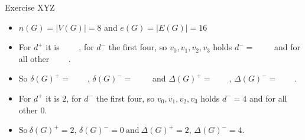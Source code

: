 \begin{frame}{Exercise \thesection}{XYZ\vspace{0.5cm}}
\begin{solution}
\begin{itemize}
      \item $n(G)=|V(G)|=8$ and $e(G)=|E(G)|=16$
    \end{itemize}
  \end{solution}
  \begin{solutionnoinc}
    \begin{itemize}
      \item For $d^+$ it is $\qquad$, for $d^-$ the first four, so $v_0, v_1, v_2, v_3$ holds $d^- = \qquad$ and for all other $\qquad$.
      \item So $\delta(G)^{+}=\qquad, \,\delta(G)^{-}=\qquad$ and $\Delta(G)^{+}=\qquad,\,\Delta(G)^{-}=\qquad.$
    \end{itemize}
  \end{solutionnoinc}
  \newpage
  \begin{solution}
    \begin{itemize}
      \item For $d^+$ it is $2$, for $d^-$ the first four, so $v_0, v_1, v_2, v_3$ holds $d^- = 4$ and for all other $0$.
      \item $\mathrm{So~}\delta(G)^{+}=2, \,\delta(G)^{-}=0\mathrm{~and~}\Delta(G)^{+}=2,\,\Delta(G)^{-}=4.$
    \end{itemize}
  \end{solution}
\end{frame}
